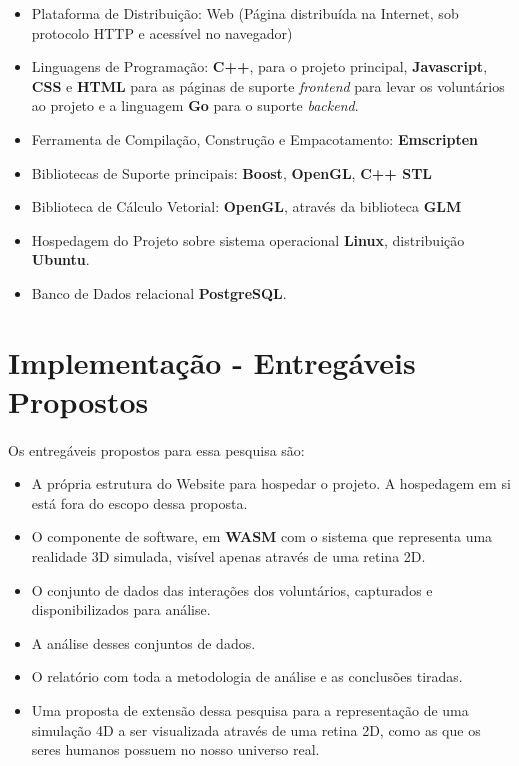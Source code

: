 \documentclass{article}
\begin{document}
	\begin{itemize}
			\item Plataforma de Distribuição: Web (Página distribuída na Internet, sob protocolo HTTP e acessível no navegador)
			\item Linguagens de Programação: \textbf{C++}, para o projeto principal, \textbf{Javascript}, \textbf{CSS} e 	\textbf{HTML} para as páginas de suporte \textit{frontend} para levar os voluntários ao projeto e a linguagem \textbf{Go} para o suporte \textit{backend}.
			\item Ferramenta de Compilação, Construção e Empacotamento: \textbf{Emscripten}
			\item Bibliotecas de Suporte principais: \textbf{Boost}, \textbf{OpenGL}, \textbf{C++ STL}
			\item Biblioteca de Cálculo Vetorial: \textbf{OpenGL}, através da biblioteca \textbf{GLM}		
			\item Hospedagem do Projeto sobre sistema operacional \textbf{Linux}, distribuição \textbf{Ubuntu}.	
			\item Banco de Dados relacional \textbf{PostgreSQL}.
	\end{itemize}
	
	\section{Implementação - Entregáveis Propostos} \label{ie}
	\paragraph{}
	Os entregáveis propostos para essa pesquisa são:
	
	\begin{itemize}
		\item A própria estrutura do Website para hospedar o projeto. A hospedagem em si está fora do escopo dessa proposta.
		\item O componente de software, em \textbf{WASM} com o sistema que representa uma realidade 3D simulada, visível apenas através de uma retina 2D.
		\item O conjunto de dados das interações dos voluntários, capturados e disponibilizados para análise.
		\item A análise desses conjuntos de dados.
		\item O relatório com toda a metodologia de análise e as conclusões tiradas.
		\item Uma proposta de extensão dessa pesquisa para a representação de uma simulação 4D a ser visualizada através de uma retina 2D, como as que os seres humanos possuem no nosso universo real.
	\end{itemize}
	
\end{document}
